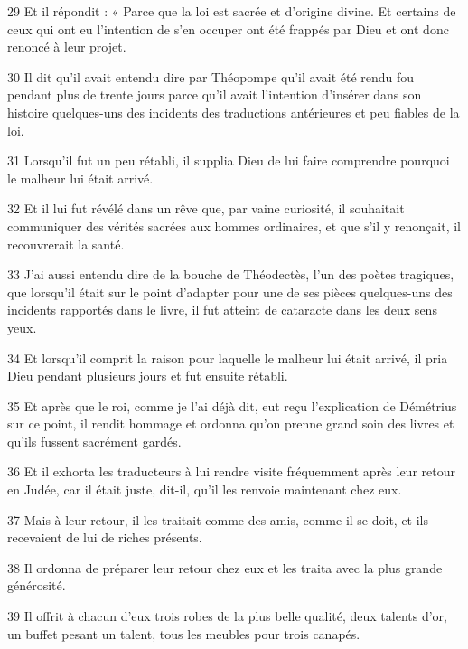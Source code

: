 \par 29 Et il répondit : « Parce que la loi est sacrée et d'origine divine. Et certains de ceux qui ont eu l'intention de s'en occuper ont été frappés par Dieu et ont donc renoncé à leur projet.

\par 30 Il dit qu'il avait entendu dire par Théopompe qu'il avait été rendu fou pendant plus de trente jours parce qu'il avait l'intention d'insérer dans son histoire quelques-uns des incidents des traductions antérieures et peu fiables de la loi.

\par 31 Lorsqu'il fut un peu rétabli, il supplia Dieu de lui faire comprendre pourquoi le malheur lui était arrivé.

\par 32 Et il lui fut révélé dans un rêve que, par vaine curiosité, il souhaitait communiquer des vérités sacrées aux hommes ordinaires, et que s'il y renonçait, il recouvrerait la santé.

\par 33 J'ai aussi entendu dire de la bouche de Théodectès, l'un des poètes tragiques, que lorsqu'il était sur le point d'adapter pour une de ses pièces quelques-uns des incidents rapportés dans le livre, il fut atteint de cataracte dans les deux sens yeux.

\par 34 Et lorsqu'il comprit la raison pour laquelle le malheur lui était arrivé, il pria Dieu pendant plusieurs jours et fut ensuite rétabli.

\par 35 Et après que le roi, comme je l'ai déjà dit, eut reçu l'explication de Démétrius sur ce point, il rendit hommage et ordonna qu'on prenne grand soin des livres et qu'ils fussent sacrément gardés.

\par 36 Et il exhorta les traducteurs à lui rendre visite fréquemment après leur retour en Judée, car il était juste, dit-il, qu'il les renvoie maintenant chez eux.

\par 37 Mais à leur retour, il les traitait comme des amis, comme il se doit, et ils recevaient de lui de riches présents.

\par 38 Il ordonna de préparer leur retour chez eux et les traita avec la plus grande générosité.

\par 39 Il offrit à chacun d'eux trois robes de la plus belle qualité, deux talents d'or, un buffet pesant un talent, tous les meubles pour trois canapés.

